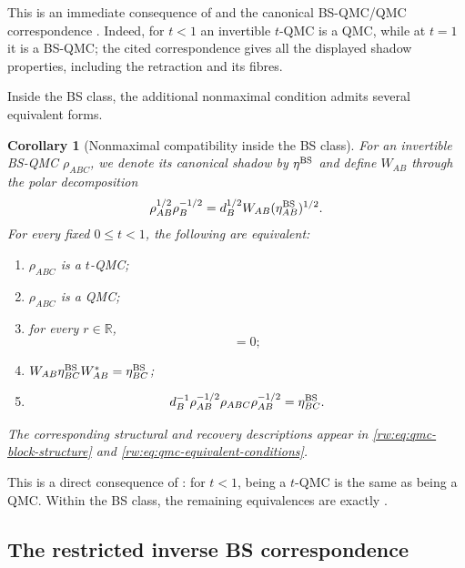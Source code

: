 \documentclass[11pt]{article}
\newtheorem{corollary}[corollary]{Corollary}
\theoremstyle{remark}
\newcommand{\1}{\mathbbm{1}}
\begin{document}
This is an immediate consequence of
 and the canonical
BS-QMC/QMC correspondence
\cite[Theorem~3.3 and Remarks~3.6--3.7]{Bluhm:2025kai}.  Indeed, for
$t<1$ an invertible $t$-QMC is a QMC, while at $t=1$ it is a
BS-QMC; the cited correspondence gives all the displayed shadow
properties, including the retraction and its fibres.

Inside the BS class, the additional nonmaximal condition admits several
equivalent forms.

\begin{corollary}[Nonmaximal compatibility inside the BS class]
\label{cor:consolidated-BS-interior-tests}
For an invertible BS-QMC $\rho_{ABC}$, we denote its canonical shadow
by $\eta^{\rm BS}$ and define $W_{AB}$ through the polar decomposition
\begin{equation}
 \rho_{AB}^{1/2}\rho_B^{-1/2}
 =d_B^{1/2}W_{AB}(\eta_{AB}^{\rm BS})^{1/2}.
 \label{eq:consolidated-shadow-polar-unitary}
\end{equation}
For every fixed $0\leq t<1$, the
following are equivalent:
\begin{enumerate}
\item $\rho_{ABC}$ is a $t$-QMC;
\item $\rho_{ABC}$ is a QMC;
\item for every $r\in\mathbb R$,
\begin{equation}
 [\rho_B^{ir}\eta_{AB}^{\rm BS}\rho_B^{-ir},
   \eta_{BC}^{\rm BS}]=0;
 \label{eq:consolidated-BS-interior-tests}
\end{equation}
\item $W_{AB}\eta_{BC}^{\rm BS}W_{AB}^*
       =\eta_{BC}^{\rm BS}$;
\item
\begin{equation}
 d_B^{-1}\rho_{AB}^{-1/2}\rho_{ABC}\rho_{AB}^{-1/2}
 =\eta_{BC}^{\rm BS}.
 \label{eq:consolidated-polar-test}
\end{equation}
\end{enumerate}
The corresponding structural and recovery descriptions appear in
\eqref{rw:eq:qmc-block-structure} and
\eqref{rw:eq:qmc-equivalent-conditions}.
\end{corollary}

This is a direct consequence of
: for $t<1$, being a $t$-QMC
is the same as being a QMC.  Within the BS class, the
remaining equivalences are exactly
\cite[Proposition~4.2]{Bluhm:2025kai}.

\subsection{The restricted inverse BS correspondence}
\end{document}
